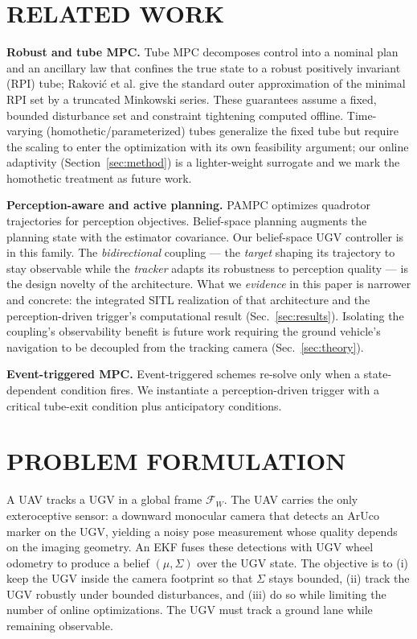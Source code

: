 \documentclass[letterpaper, 10 pt, conference]{ieeeconf}  %
\begin{document}
\section{RELATED WORK}
\label{sec:related}

\textbf{Robust and tube MPC.} Tube MPC \cite{mayne2005robust} decomposes control
into a nominal plan and an ancillary law that confines the true state to a robust
positively invariant (RPI) tube; Rakovi\'c et al. \cite{mRPI} give the standard
outer approximation of the minimal RPI set by a truncated Minkowski series. These
guarantees assume a fixed, bounded disturbance set and constraint tightening
computed offline. Time-varying (homothetic/parameterized) tubes generalize the
fixed tube but require the scaling to enter the optimization with its own
feasibility argument; our online adaptivity (Section~\ref{sec:method}) is a
lighter-weight surrogate and we mark the homothetic treatment as future work.

\textbf{Perception-aware and active planning.} PAMPC \cite{falanga2018pampc}
optimizes quadrotor trajectories for perception objectives. Belief-space planning
\cite{platt2010belief,vandenberg2012motion} augments the planning state with the
estimator covariance. Our belief-space UGV controller is in this family. The
\emph{bidirectional} coupling --- the \emph{target} shaping its trajectory to stay
observable while the \emph{tracker} adapts its robustness to perception quality ---
is the design novelty of the architecture. What we \emph{evidence} in this paper is
narrower and concrete: the integrated SITL realization of that architecture and the
perception-driven trigger's computational result (Sec.~\ref{sec:results}).
Isolating the coupling's observability benefit is future work requiring the ground
vehicle's navigation to be decoupled from the tracking camera (Sec.~\ref{sec:theory}).

\textbf{Event-triggered MPC.} Event-triggered schemes \cite{eqtami2010event}
re-solve only when a state-dependent condition fires. We instantiate a
perception-driven trigger with a critical tube-exit condition plus anticipatory
conditions.

\section{PROBLEM FORMULATION}
\label{sec:problem}

A UAV tracks a UGV in a global frame $\mathcal{F}_W$. The UAV carries the only
exteroceptive sensor: a downward monocular camera that detects an ArUco marker on
the UGV, yielding a noisy pose measurement whose quality depends on the imaging
geometry. An EKF fuses these detections with UGV wheel odometry to produce a
belief $(\mu,\Sigma)$ over the UGV state. The objective is to (i) keep the UGV
inside the camera footprint so that $\Sigma$ stays bounded, (ii) track the UGV
robustly under bounded disturbances, and (iii) do so while limiting the number of
online optimizations. The UGV must track a ground lane while remaining
observable.
\end{document}
